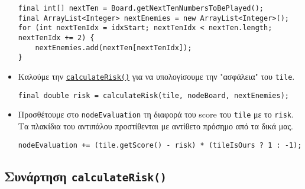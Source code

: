 \begin{itemize}
\begin{lstlisting}[style=chunk]
final int[] nextTen = Board.getNextTenNumbersToBePlayed();
final ArrayList<Integer> nextEnemies = new ArrayList<Integer>();
for (int nextTenIdx = idxStart; nextTenIdx < nextTen.length; nextTenIdx += 2) {
    nextEnemies.add(nextTen[nextTenIdx]);
}
\end{lstlisting}

\item Καλούμε την
\hyperref[fun:calculateRisk]{\lstinline!calculateRisk()!}
για να υπολογίσουμε την "ασφάλεια" του \lstinline!tile!.
\begin{lstlisting}[style=chunk]
final double risk = calculateRisk(tile, nodeBoard, nextEnemies);
\end{lstlisting}

\item Προσθέτουμε στο \lstinline!nodeEvaluation! τη διαφορά του score του \lstinline!tile! με το \lstinline!risk!.
Τα πλακίδια του αντιπάλου προστίθενται με αντίθετο πρόσημο από τα δικά μας.
\begin{lstlisting}[style=chunk]
nodeEvaluation += (tile.getScore() - risk) * (tileIsOurs ? 1 : -1);
\end{lstlisting}
\end{itemize}

\subsection{Συνάρτηση \texttt{calculateRisk()}}\label{fun:calculateRisk}
